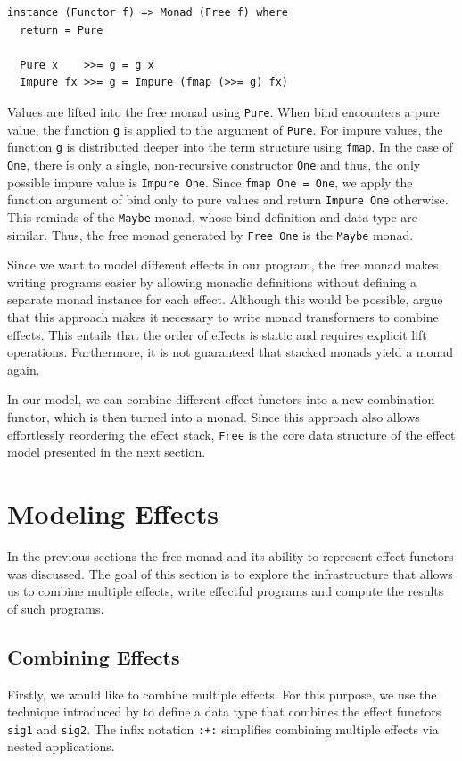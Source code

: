 \documentclass[a4paper, 11pt, fleqn, twoside, abstract=on]{scrreprt}
\newcommand{\hinl}[1]{\texttt{#1}}
\newcommand{\cinl}[1]{\texttt{#1}}
\begin{document}
\begin{verbatim}
instance (Functor f) => Monad (Free f) where
  return = Pure

  Pure x    >>= g = g x
  Impure fx >>= g = Impure (fmap (>>= g) fx)
\end{verbatim}

Values are lifted into the free monad using \cinl{Pure}.
When bind encounters a pure value, the function \hinl{g} is applied to the argument of \hinl{Pure}.
For impure values, the function \hinl{g} is distributed deeper into the term structure using \hinl{fmap}.
In the case of \hinl{One}, there is only a single, non-recursive constructor \hinl{One} and thus, the only possible impure value is \hinl{Impure One}.
Since \hinl{fmap One = One}, we apply the function argument of bind only to pure values and return \cinl{Impure One} otherwise.
This reminds of the \hinl{Maybe} monad, whose bind definition and data type are similar.
Thus, the free monad generated by \hinl{Free One} is the \hinl{Maybe} monad.


Since we want to model different effects in our program, the free monad makes writing programs easier by allowing monadic definitions without defining a separate monad instance for each effect.
Although this would be possible, \citet{kammar2013handlers} argue that this approach makes it necessary to write monad transformers to combine effects.
This entails that the order of effects is static and requires explicit lift operations.
Furthermore, it is not guaranteed that stacked monads yield a monad again.

In our model, we can combine different effect functors into a new combination functor, which is then turned into a monad.
Since this approach also allows effortlessly reordering the effect stack, \hinl{Free} is the core data structure of the effect model presented in the next section.

\section{Modeling Effects}
In the previous sections the free monad and its ability to represent effect functors was discussed.
The goal of this section is to explore the infrastructure that allows us to combine multiple effects, write effectful programs and compute the results of such programs.

\subsection{Combining Effects}
Firstly, we would like to combine multiple effects.
For this purpose, we use the technique introduced by \citet{swierstra2008} to define a data type that combines the effect functors \hinl{sig1} and \hinl{sig2}.
The infix notation \hinl{:+:} simplifies combining multiple effects via nested applications.
\end{document}
